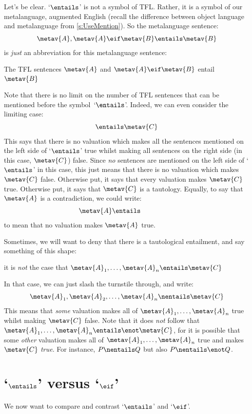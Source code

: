 Let's be clear. `$\entails$' is not a symbol of TFL. Rather, it is a symbol of our metalanguage, augmented English (recall the difference between object language and metalanguage from \cref{s:UseMention}). So the metalanguage sentence:
	\[\metav{A}, \metav{A} \eif \metav{B} \entails \metav{B}\]
is \emph{just} an abbreviation for this metalanguage sentence: 
	\begin{center}
		The TFL sentences $\metav{A}$ and $\metav{A} \eif \metav{B}$ entail $\metav{B}$
	\end{center}
Note that there is no limit on the number of TFL sentences that can be mentioned before the symbol~`$\entails$'. Indeed, we can even consider the limiting case:
	$$\entails \metav{C}$$
This says that there is no valuation which makes all the sentences
mentioned on the left side of `$\entails$' true whilst making all
sentences on the right side (in this case, $\metav{C}$) false. Since \emph{no} sentences are mentioned on the left
side of `$\entails$' in this case, this just means that there is no
valuation which makes $\metav{C}$ false. Otherwise put, it says that
every valuation makes $\metav{C}$ true. Otherwise put, it says that
$\metav{C}$ is a tautology. Equally, to say that $\metav{A}$ is a
contradiction, we could write:
	$$\metav{A} \entails\phantom{\metav{C}}$$
to mean that no valuation makes $\metav{A}$ true.

Sometimes, we will want to deny that there is a tautological entailment, and say something of this shape: 
\begin{center}
	it is \emph{not} the case that $\metav{A}_1, \ldots, \metav{A}_n \entails \metav{C}$
\end{center}
In that case, we can just slash the turnstile through, and write: 
$$\metav{A}_1, \metav{A}_2, \ldots, \metav{A}_n \nentails\metav{C}$$
This means that \emph{some} valuation makes all of $\metav{A}_1,
\ldots, \metav{A}_n$ true whilst making $\metav{C}$ false. Note that
it does \emph{not} follow that $\metav{A}_1,\ldots, \metav{A}_n
\entails \enot \metav{C}$, for it is possible that some \emph{other}
valuation makes all of $\metav{A}_1, \ldots, \metav{A}_n$ true and
makes $\metav{C}$ \emph{true}. For instance, $P \nentails Q$ but also
$P \nentails \enot Q$.

\section{`$\entails$' versus `$\eif$'}\label{entails-v-iff}
We now want to compare and contrast `$\entails$' and `$\eif$'.

